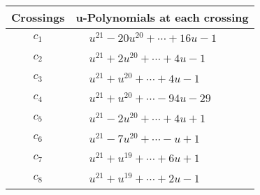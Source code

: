 \documentclass[1p]{elsarticle_modified}
\theoremstyle{definition}
\begin{document}
\begin{tabular}{m{50pt}|m{274pt}}
Crossings & \hspace{64pt}u-Polynomials at each crossing \\
\hline $$\begin{aligned}c_{1}\end{aligned}$$&$\begin{aligned}
&u^{21}-20 u^{20}+\cdots+16 u-1
\end{aligned}$\\
\hline $$\begin{aligned}c_{2}\end{aligned}$$&$\begin{aligned}
&u^{21}+2 u^{20}+\cdots+4 u-1
\end{aligned}$\\
\hline $$\begin{aligned}c_{3}\end{aligned}$$&$\begin{aligned}
&u^{21}+u^{20}+\cdots+4 u-1
\end{aligned}$\\
\hline $$\begin{aligned}c_{4}\end{aligned}$$&$\begin{aligned}
&u^{21}+u^{20}+\cdots-94 u-29
\end{aligned}$\\
\hline $$\begin{aligned}c_{5}\end{aligned}$$&$\begin{aligned}
&u^{21}-2 u^{20}+\cdots+4 u+1
\end{aligned}$\\
\hline $$\begin{aligned}c_{6}\end{aligned}$$&$\begin{aligned}
&u^{21}-7 u^{20}+\cdots- u+1
\end{aligned}$\\
\hline $$\begin{aligned}c_{7}\end{aligned}$$&$\begin{aligned}
&u^{21}+u^{19}+\cdots+6 u+1
\end{aligned}$\\
\hline $$\begin{aligned}c_{8}\end{aligned}$$&$\begin{aligned}
&u^{21}+u^{19}+\cdots+2 u-1
\end{aligned}$\\

\end{tabular}
\end{document}
